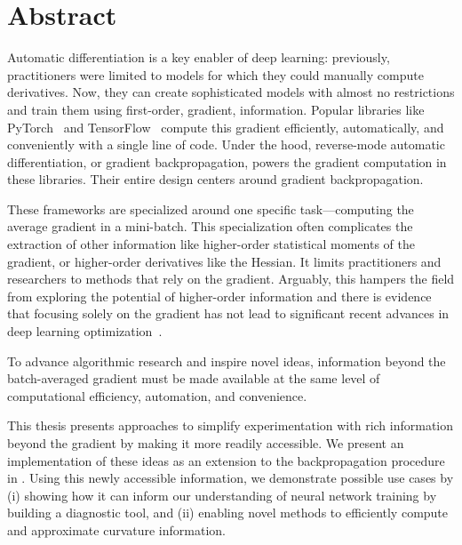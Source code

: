 
\chapter{Abstract}
Automatic differentiation is a key enabler of deep learning: previously,
practitioners were limited to models for which they could manually compute
derivatives. Now, they can create sophisticated models with almost no
restrictions and train them using first-order, \ie gradient, information.
Popular libraries like PyTorch~\cite{paszke2019pytorch} and
TensorFlow~\cite{abadi2016tensorflow} compute this gradient efficiently,
automatically, and conveniently with a single line of code. Under the hood,
reverse-mode automatic differentiation, or gradient backpropagation, powers the
gradient computation in these libraries. Their entire design centers around
gradient backpropagation.

These frameworks are specialized around one specific task---computing the
average gradient in a mini-batch. This specialization often complicates the
extraction of other information like higher-order statistical moments of the
gradient, or higher-order derivatives like the Hessian. It limits practitioners
and researchers to methods that rely on the gradient. Arguably, this hampers the
field from exploring the potential of higher-order information and there is
evidence that focusing solely on the gradient has not lead to significant recent
advances in deep learning optimization~\cite{schmidt2021descending}.

To advance algorithmic research and inspire novel ideas, information beyond the
batch-averaged gradient must be made available at the same level of
computational efficiency, automation, and convenience.

This thesis presents approaches to simplify experimentation with rich
information beyond the gradient by making it more readily accessible. We present
an implementation of these ideas as an extension to the backpropagation
procedure in \pytorch. Using this newly accessible information, we demonstrate
possible use cases by (i) showing how it can inform our understanding of neural
network training by building a diagnostic tool, and (ii) enabling novel methods
to efficiently compute and approximate curvature information.

